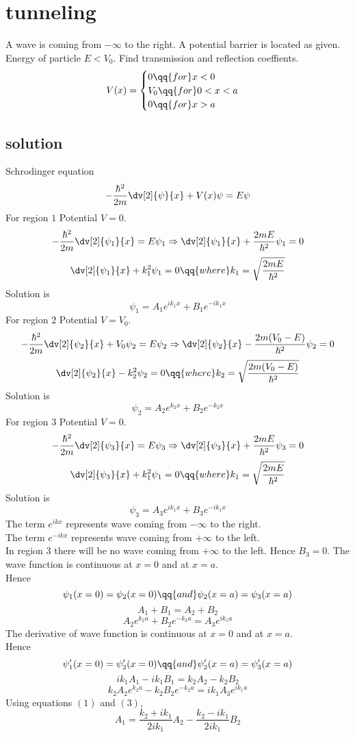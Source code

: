 \section*{tunneling}
A wave is coming from $-\infty$ to the right. A potential barrier is located as given. 
Energy of particle $E<V_0$. Find transmission and reflection coeffients.
$$
V(x)=
\begin{cases}
    0 \qq{for} x < 0 \\
    V_0 \qq{for} 0 < x < a \\
    0 \qq{for} x > a
\end{cases}
$$
\subsection*{solution}
Schrodinger equation 
\[-\frac{\hbar^2}{2m}\dv[2]{\psi}{x}+V(x)\psi=E\psi\]
For region $1$ Potential $V=0$. 
\[-\frac{\hbar^2}{2m}\dv[2]{\psi_1}{x}=E\psi_1\Rightarrow \dv[2]{\psi_1}{x}+\frac{2mE}{\hbar^2}\psi_1=0\]
\[\dv[2]{\psi_1}{x}+k_1^2\psi_1=0\qq{where} k_1=\sqrt{\frac{2mE}{\hbar^2}}\]
Solution is 
\[\psi_1=A_1e^{ik_1x}+B_1e^{-ik_1x}\]
For region $2$ Potential $V=V_0$. 
\[-\frac{\hbar^2}{2m}\dv[2]{\psi_2}{x}+V_0\psi_2=E\psi_2\Rightarrow \dv[2]{\psi_2}{x}-\frac{2m(V_0-E)}{\hbar^2}\psi_2=0\]
\[\dv[2]{\psi_2}{x}-k_2^2\psi_2=0\qq{where} k_2=\sqrt{\frac{2m(V_0-E)}{\hbar^2}}\]
Solution is 
\[\psi_2=A_2e^{k_2x}+B_2e^{-k_2x}\]
For region $3$ Potential $V=0$. 
\[-\frac{\hbar^2}{2m}\dv[2]{\psi_3}{x}=E\psi_3\Rightarrow \dv[2]{\psi_3}{x}+\frac{2mE}{\hbar^2}\psi_3=0\]
\[\dv[2]{\psi_3}{x}+k_1^2\psi_1=0\qq{where} k_1=\sqrt{\frac{2mE}{\hbar^2}}\]
Solution is 
\[\psi_3=A_3e^{ik_1x}+B_3e^{-ik_1x}\]
\newpage
The term $e^{ikx}$ represents wave coming from $-\infty$ to the right.\\
The term $e^{-ikx}$ represents wave coming from $+\infty$ to the left.\\
In region $3$ there will be no wave coming from $+\infty$ to the left. Hence $B_3=0$.
The wave function is continuous at $x=0$ and at $x=a$.\\
Hence 
\[\psi_1(x=0)=\psi_2(x=0) \qq{and} \psi_2(x=a)=\psi_3(x=a)\]
\[A_1+B_1=A_2+B_2\tag{1}\]
\[A_2e^{k_2a}+B_2e^{-k_2a}=A_3e^{ik_1a}\tag{2}\]
The derivative of wave function is continuous at $x=0$ and at $x=a$.\\
Hence 
\[\psi'_1(x=0)=\psi'_2(x=0) \qq{and} \psi'_2(x=a)=\psi'_3(x=a)\]
\[ik_1A_1-ik_1B_1=k_2A_2-k_2B_2\tag{3}\]
\[k_2A_2e^{k_2a}-k_2B_2e^{-k_2a}=ik_1A_3e^{ik_1a}\tag{4}\]
Using equations $(1)$ and $(3)$,
\[A_1=\frac{k_2+ik_1}{2ik_1}A_2-\frac{k_2-ik_1}{2ik_1}B_2\]
